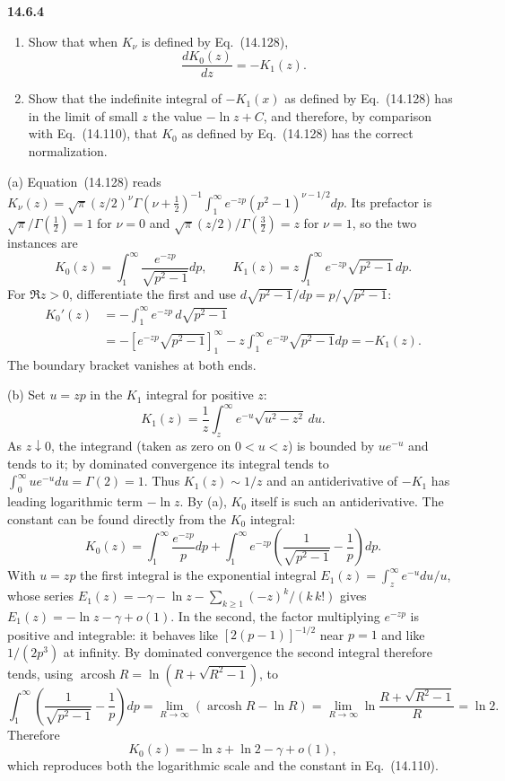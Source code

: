 \par\bigskip
\noindent\textbf{14.6.4}
\begin{enumerate}
\item[(a)] Show that when $K_{\nu}$ is defined by Eq.~(14.128),
\[
\frac{dK_{0}(z)}{dz}=-K_{1}(z).
\]
\item[(b)] Show that the indefinite integral of $-K_{1}(x)$ as defined
by Eq.~(14.128) has in the limit of small $z$ the value $-\ln z+C$,
and therefore, by comparison with Eq.~(14.110), that $K_{0}$ as
defined by Eq.~(14.128) has the correct normalization.
\end{enumerate}
\par{}
\solution
(a) Equation~(14.128) reads
$K_\nu(z)=\sqrt\pi(z/2)^\nu\Gamma(\nu+\tfrac12)^{-1}
\int_1^\infty e^{-zp}(p^2-1)^{\nu-1/2}dp$. Its prefactor is
$\sqrt\pi/\Gamma(\frac12)=1$ for $\nu=0$ and
$\sqrt\pi(z/2)/\Gamma(\frac32)=z$ for $\nu=1$, so the two
instances are
\[
K_0(z)=\int_1^\infty\frac{e^{-zp}}{\sqrt{p^2-1}}dp,
\qquad K_1(z)=z\int_1^\infty e^{-zp}\sqrt{p^2-1}\,dp.
\]
For $\Re z>0$, differentiate the first and use
$d\sqrt{p^2-1}/dp=p/\sqrt{p^2-1}$:
\begin{align*}
K_0'(z)&=-\int_1^\infty e^{-zp}\,d\sqrt{p^2-1}\\
&=-[e^{-zp}\sqrt{p^2-1}]_1^\infty
-z\int_1^\infty e^{-zp}\sqrt{p^2-1}dp
=\boxed{-K_1(z)}.
\end{align*}
The boundary bracket vanishes at both ends.

(b) Set $u=zp$ in the $K_1$ integral for positive $z$:
\[
K_1(z)=\frac1z\int_z^\infty e^{-u}\sqrt{u^2-z^2}\,du.
\]
As $z\downarrow0$, the integrand (taken as zero on $0<u<z$) is
bounded by $ue^{-u}$ and tends to it; by dominated convergence
its integral tends to $\int_0^\infty ue^{-u}du=\Gamma(2)=1$.
Thus $K_1(z)\sim1/z$ and an antiderivative of $-K_1$ has
leading logarithmic term $-\ln z$. By (a), $K_0$ itself is such an
antiderivative.
The constant can be found directly from the $K_0$ integral:
\[
K_0(z)=\int_1^\infty\frac{e^{-zp}}pdp
+\int_1^\infty e^{-zp}
\left(\frac1{\sqrt{p^2-1}}-\frac1p\right)dp.
\]
With $u=zp$ the first integral is the exponential integral
$E_1(z)=\int_z^\infty e^{-u}du/u$, whose series
$E_1(z)=-\gamma-\ln z-\sum_{k\ge1}(-z)^k/(k\,k!)$ gives
$E_1(z)=-\ln z-\gamma+o(1)$.
In the second, the factor multiplying $e^{-zp}$ is positive and
integrable: it behaves like $[2(p-1)]^{-1/2}$ near $p=1$ and like
$1/(2p^3)$ at infinity. By dominated convergence the second integral
therefore tends, using $\operatorname{arcosh}R=\ln(R+\sqrt{R^2-1})$, to
\[
\int_1^\infty\left(\frac1{\sqrt{p^2-1}}-\frac1p\right)dp
=\lim_{R\to\infty}(\operatorname{arcosh}R-\ln R)
=\lim_{R\to\infty}\ln\frac{R+\sqrt{R^2-1}}R=\ln2.
\]
Therefore
\[
\boxed{K_0(z)=-\ln z+\ln2-\gamma+o(1)},
\]
which reproduces both the logarithmic scale and the constant in
Eq.~(14.110).


